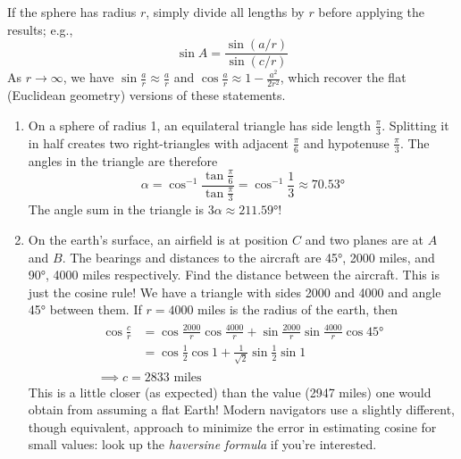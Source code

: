 If the sphere has radius $r$, simply divide all lengths by $r$ before applying the results; e.g.,
\[
	\sin A=\frac{\sin (a/r)}{\sin(c/r)}
\]
As $r\to\infty$, we have $\sin\frac ar\approx \frac ar$ and $\cos\frac ar\approx 1-\frac{a^2}{2r^2}$, which recover the flat (Euclidean geometry) versions of these statements.


\begin{enumerate}
	\item On a sphere of radius 1, an equilateral triangle has side length $\frac\pi 3$. Splitting it in half creates two right-triangles with adjacent $\frac\pi 6$ and hypotenuse $\frac\pi 3$. The angles in the triangle are therefore
	\[
		\alpha=\cos^{-1}\frac{\tan\frac\pi 6}{\tan\frac\pi 3}=\cos^{-1}\frac 13\approx \ang{70.53}
	\]
	The angle sum in the triangle is $3\alpha\approx\ang{211.59}$!
	
	\item On the earth's surface, an airfield is at position $C$ and two planes are at $A$ and $B$. The bearings and distances to the aircraft are \ang{45}, 2000 miles, and \ang{90}, 4000 miles respectively. Find the distance between the aircraft.\smallbreak
	This is just the cosine rule! We have a triangle with sides 2000 and 4000 and angle \ang{45} between them. If $r=4000$ miles is the radius of the earth, then
	\begin{gather*}
		\begin{aligned}
			\cos\frac cr &=\cos\frac{2000}r\cos\frac{4000}r+\sin\frac{2000}r\sin\frac{4000}r\cos\ang{45}\\
			&=\cos\frac 12\cos 1+\frac 1{\sqrt 2}\sin\frac 12\sin 1
		\end{aligned}\\
		\implies c=2833\text{ miles}
	\end{gather*}
	This is a little closer (as expected) than the value (2947 miles) one would obtain from assuming a flat Earth!\smallbreak
	Modern navigators use a slightly different, though equivalent, approach to minimize the error in estimating cosine for small values: look up the \emph{haversine formula} if you're interested.
\end{enumerate}



